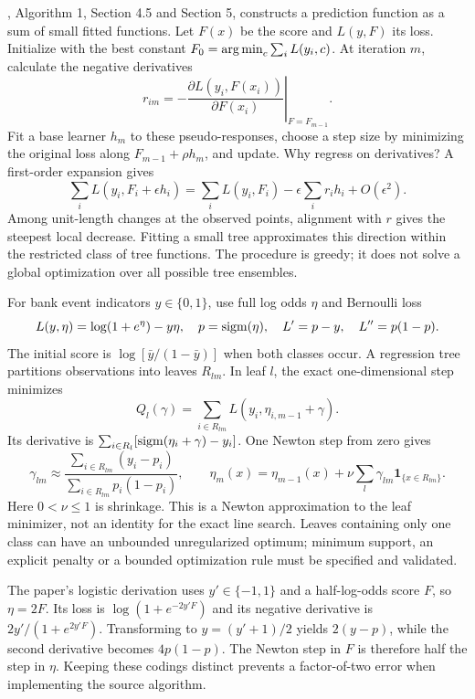 \citet{friedman2001greedy}, Algorithm 1, Section 4.5 and Section 5, constructs a prediction function as a sum of small fitted functions. Let $F(x)$ be the score and $L(y,F)$ its loss. Initialize with the best constant $F_0=\operatorname*{arg\,min}_c\sum_i L(y_i,c)$. At iteration $m$, calculate the negative derivatives
\begin{equation}
 r_{im}=-\left.\frac{\partial L(y_i,F(x_i))}{\partial F(x_i)}\right|_{F=F_{m-1}}.
 \label{eq:pseudoresponse}
\end{equation}
Fit a base learner $h_m$ to these pseudo-responses, choose a step size by minimizing the original loss along $F_{m-1}+\rho h_m$, and update. Why regress on derivatives? A first-order expansion gives
\[
 \sum_i L(y_i,F_i+\epsilon h_i)
 =\sum_i L(y_i,F_i)-\epsilon\sum_i r_i h_i+O(\epsilon^2).
\]
Among unit-length changes at the observed points, alignment with $r$ gives the steepest local decrease. Fitting a small tree approximates this direction within the restricted class of tree functions. The procedure is greedy; it does not solve a global optimization over all possible tree ensembles.

For bank event indicators $y\in\{0,1\}$, use full log odds $\eta$ and Bernoulli loss
\[
 L(y,\eta)=\log(1+e^\eta)-y\eta,\quad
 p=\operatorname{sigm}(\eta),\quad L'=p-y,\quad L''=p(1-p).
\]
The initial score is $\log[\bar y/(1-\bar y)]$ when both classes occur. A regression tree partitions observations into leaves $R_{lm}$. In leaf $l$, the exact one-dimensional step minimizes
\[
 Q_l(\gamma)=\sum_{i\in R_{lm}}L(y_i,\eta_{i,m-1}+\gamma).
\]
Its derivative is $\sum_{i\in R_l}[\operatorname{sigm}(\eta_i+\gamma)-y_i]$. One Newton step from zero gives
\begin{equation}
 \gamma_{lm}\approx
 \frac{\sum_{i\in R_{lm}}(y_i-p_i)}{\sum_{i\in R_{lm}}p_i(1-p_i)},\qquad
 \eta_m(x)=\eta_{m-1}(x)+\nu\sum_l\gamma_{lm}\mathbf1_{\{x\in R_{lm}\}}.
 \label{eq:boosting-newton}
\end{equation}
Here $0<\nu\le1$ is shrinkage. This is a Newton approximation to the leaf minimizer, not an identity for the exact line search. Leaves containing only one class can have an unbounded unregularized optimum; minimum support, an explicit penalty or a bounded optimization rule must be specified and validated.

The paper's logistic derivation uses $y'\in\{-1,1\}$ and a half-log-odds score $F$, so $\eta=2F$. Its loss is $\log(1+e^{-2y'F})$ and its negative derivative is $2y'/(1+e^{2y'F})$. Transforming to $y=(y'+1)/2$ yields $2(y-p)$, while the second derivative becomes $4p(1-p)$. The Newton step in $F$ is therefore half the step in $\eta$. Keeping these codings distinct prevents a factor-of-two error when implementing the source algorithm.

